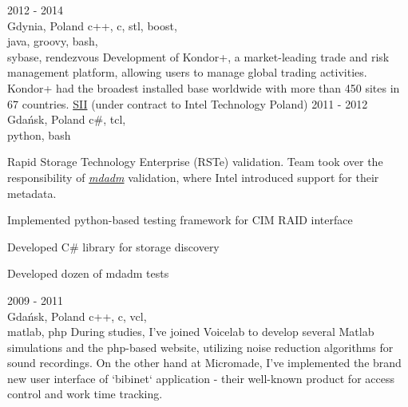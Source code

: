      {2012 - 2014\\Gdynia, Poland}
      {c++, c, stl, boost,\\java, groovy, bash,\\sybase, rendezvous}
      {Development of Kondor+, a market-leading trade and risk management platform,
        allowing users to manage global trading activities. Kondor+ had the broadest
        installed base worldwide with more than 450 sites in 67 countries.
      }
      {\href{https://sii.pl/en/}{SII} (under contract to Intel Technology Poland)}
      {2011 - 2012\\Gdańsk, Poland}
      {c\#, tcl,\\python, bash}
      {Rapid Storage Technology Enterprise (RSTe) validation. Team took over the responsibility
        of \href{https://en.wikipedia.org/wiki/Mdadm}{\emph{mdadm}} validation, where Intel
        introduced support for their metadata.
        \begin{missions}
        \item Implemented python-based testing framework for CIM RAID interface
        \item Developed C\# library for storage discovery
        \item Developed dozen of mdadm tests
        \end{missions}
      }      
      {2009 - 2011\\Gdańsk, Poland} {c++, c, vcl,\\matlab, php}
      {During studies, I've joined Voicelab to develop several
      Matlab simulations and the php-based website, utilizing noise
      reduction algorithms for sound recordings. On the other hand at
      Micromade, I've implemented the brand new user interface of
      `bibinet` application - their well-known product for access
      control and work time tracking. }
      
